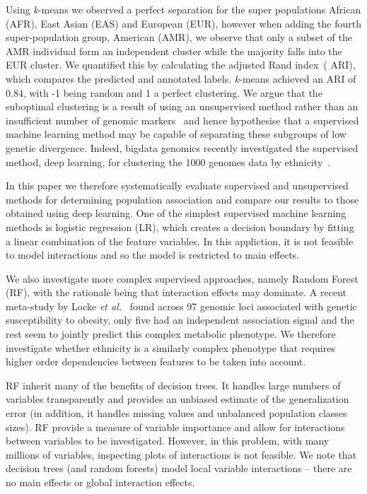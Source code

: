 \documentclass{llncs}
\newcommand{\kMeans}{\textit{k}-means }
\newcommand{\ARI}{adjusted Rand index}
\begin{document}
{Using \kMeans{} we observed a perfect separation for the super populations African (AFR), East Asian (EAS) and European
(EUR), however when adding the fourth super-population group, American (AMR), we observe that only a subset of the AMR
individual form an independent cluster while the majority falls into the EUR cluster.  We quantified this by calculating
the \ARI\ ( ARI), which compares the predicted and annotated labels. \kMeans achieved an ARI of 0.84, with -1 being
random and 1 a perfect clustering.  We argue that the suboptimal clustering is a result of using an unsupervised method
rather than an insufficient number of genomic markers~\cite{Patterson2006} and hence hypothesise that a supervised
machine learning method may be capable of separating these subgroups of low genetic divergence.  Indeed, bigdata
genomics recently investigated the supervised method, deep learning, for clustering the 1000 genomes data by
ethnicity~\cite{Ferguson}.  

In this paper we therefore systematically evaluate supervised and unsupervised methods for determining population
association and compare our results to those obtained using deep learning.
One of the simplest supervised machine learning methods is logistic regression (LR), which creates a decision boundary
by fitting a linear combination of the feature variables.  In this appliction, it is not feasible to model interactions and
so the model is restricted to main effects. 

We also investigate more complex supervised
approaches, namely Random Forest (RF), with the rationale being that interaction effects may dominate. A recent meta-study by
Locke {\it et al.}~\cite{Locke2015} found across 97 genomic loci associated with genetic susceptibility to obesity, only five
had an independent association signal and the rest seem to jointly predict this complex metabolic phenotype.  
We therefore investigate whether ethnicity is a similarly complex phenotype that requires higher order dependencies between
features to be taken into account. %

RF inherit many of the benefits of decision trees. It handles large numbers of variables transparently and
provides an unbiased estimate of the generalization error (in addition, it handles missing values and unbalanced
population classes sizes). RF provide a measure of variable importance and allow for interactions between
variables to be investigated. However, in this problem, with many millions of variables, inspecting plots of interactions
is not feasible.  We note that decision trees (and random forests) model local variable interactions -- there are 
no main effects or global interaction effects. 

}
\end{document}
